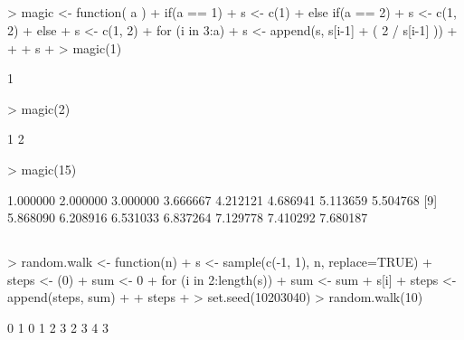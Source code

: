 \documentclass[letterpaper]{report}
\begin{document}
\subsection{}
\begin{Schunk}
\begin{Sinput}
> magic <- function( a ) {
+     if(a == 1) {
+         s <- c(1)
+     } else if(a == 2) {
+         s <- c(1, 2)
+     } else {
+         s <- c(1, 2)
+         for (i in 3:a) {
+             s <- append(s, s[i-1] + ( 2 / s[i-1] ))
+         }
+     }
+     s
+ }
> magic(1)
\end{Sinput}
\begin{Soutput}
[1] 1
\end{Soutput}
\begin{Sinput}
> magic(2)
\end{Sinput}
\begin{Soutput}
[1] 1 2
\end{Soutput}
\begin{Sinput}
> magic(15)
\end{Sinput}
\begin{Soutput}
 [1] 1.000000 2.000000 3.000000 3.666667 4.212121 4.686941 5.113659 5.504768
 [9] 5.868090 6.208916 6.531033 6.837264 7.129778 7.410292 7.680187
\end{Soutput}
\end{Schunk}

\subsection{}
\begin{Schunk}
\begin{Sinput}
> random.walk <- function(n) {
+     s <- sample(c(-1, 1), n, replace=TRUE)
+     steps <- (0)
+     sum <- 0
+     for (i in 2:length(s)) {
+         sum <- sum + s[i]
+         steps <- append(steps, sum)
+     }
+     steps
+ }
> set.seed(10203040)
> random.walk(10)
\end{Sinput}
\begin{Soutput}
 [1] 0 1 0 1 2 3 2 3 4 3
\end{Soutput}
\end{Schunk}
\end{document}
